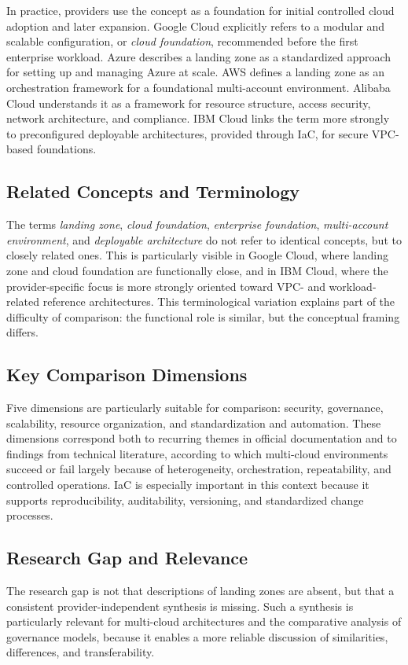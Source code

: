 In practice, providers use the concept as a foundation for initial controlled cloud adoption and later expansion. Google Cloud explicitly refers to a modular and scalable configuration, or \emph{cloud foundation}, recommended before the first enterprise workload. Azure describes a landing zone as a standardized approach for setting up and managing Azure at scale. AWS defines a landing zone as an orchestration framework for a foundational multi-account environment. Alibaba Cloud understands it as a framework for resource structure, access security, network architecture, and compliance. IBM Cloud links the term more strongly to preconfigured deployable architectures, provided through IaC, for secure VPC-based foundations.

\subsection{Related Concepts and Terminology}

The terms \emph{landing zone}, \emph{cloud foundation}, \emph{enterprise foundation}, \emph{multi-account environment}, and \emph{deployable architecture} do not refer to identical concepts, but to closely related ones. This is particularly visible in Google Cloud, where landing zone and cloud foundation are functionally close, and in IBM Cloud, where the provider-specific focus is more strongly oriented toward VPC- and workload-related reference architectures. This terminological variation explains part of the difficulty of comparison: the functional role is similar, but the conceptual framing differs.

\subsection{Key Comparison Dimensions}

Five dimensions are particularly suitable for comparison: security, governance, scalability, resource organization, and standardization and automation. These dimensions correspond both to recurring themes in official documentation and to findings from technical literature, according to which multi-cloud environments succeed or fail largely because of heterogeneity, orchestration, repeatability, and controlled operations. IaC is especially important in this context because it supports reproducibility, auditability, versioning, and standardized change processes.

\subsection{Research Gap and Relevance}

The research gap is not that descriptions of landing zones are absent, but that a consistent provider-independent synthesis is missing. Such a synthesis is particularly relevant for multi-cloud architectures and the comparative analysis of governance models, because it enables a more reliable discussion of similarities, differences, and transferability.